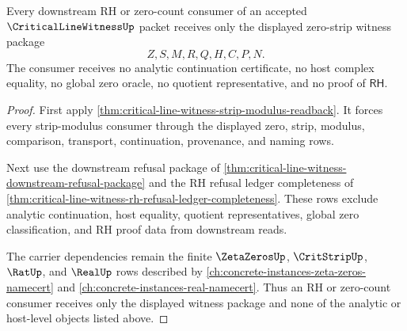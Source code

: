 \begin{theorem}
\label{thm:critical-line-witness-zero-strip-consumer-boundary}
Every downstream RH or zero-count consumer of an accepted $\CriticalLineWitnessUp$ packet receives only the displayed zero-strip witness package
$$
Z,S,M,R,Q,H,C,P,N.
$$
The consumer receives no analytic continuation certificate, no host complex equality, no global zero oracle, no quotient representative, and no proof of $\mathsf{RH}$.
\end{theorem}
\begin{proof}
First apply \autoref{thm:critical-line-witness-strip-modulus-readback}. It forces every strip-modulus consumer through the displayed zero, strip, modulus, comparison, transport, continuation, provenance, and naming rows.

Next use the downstream refusal package of \autoref{thm:critical-line-witness-downstream-refusal-package} and the RH refusal ledger completeness of \autoref{thm:critical-line-witness-rh-refusal-ledger-completeness}. These rows exclude analytic continuation, host equality, quotient representatives, global zero classification, and RH proof data from downstream reads.

The carrier dependencies remain the finite $\ZetaZerosUp$, $\CritStripUp$, $\RatUp$, and $\RealUp$ rows described by \autoref{ch:concrete-instances-zeta-zeros-namecert} and \autoref{ch:concrete-instances-real-namecert}. Thus an RH or zero-count consumer receives only the displayed witness package and none of the analytic or host-level objects listed above.
\end{proof}
